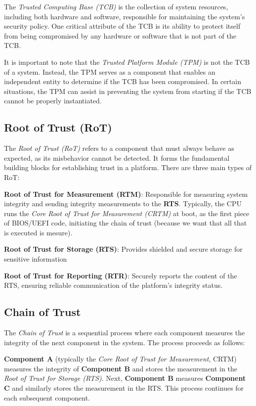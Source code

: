 The \textit{Trusted Computing Base (TCB)} is the collection of system resources, including both hardware and software, responsible for maintaining the system's security policy. One critical attribute of the TCB is its ability to protect itself from being compromised by any hardware or software that is not part of the TCB.

It is important to note that the \textit{Trusted Platform Module (TPM)} is not the TCB of a system. Instead, the TPM serves as a component that enables an independent entity to determine if the TCB has been compromised. In certain situations, the TPM can assist in preventing the system from starting if the TCB cannot be properly instantiated.

\subsection{Root of Trust (RoT)}

The \textit{Root of Trust (RoT)} refers to a component that must always behave as expected, as its misbehavior cannot be detected. It forms the fundamental building blocks for establishing trust in a platform. There are three main types of RoT:

\textbf{Root of Trust for Measurement (RTM)}:  
Responsible for measuring system integrity and sending integrity measurements to the \textbf{RTS}. Typically, the CPU runs the \textit{Core Root of Trust for Measurement (CRTM)} at boot, as the first piece of BIOS/UEFI code, initiating the chain of trust (because we want that all that is executed is mesure).

\textbf{Root of Trust for Storage (RTS)}:  
Provides shielded and secure storage for sensitive information

\textbf{Root of Trust for Reporting (RTR)}:  
Securely reports the content of the RTS, ensuring reliable communication of the platform’s integrity status.


\subsection{Chain of Trust}

The \textit{Chain of Trust} is a sequential process where each component measures the integrity of the next component in the system. The process proceeds as follows:

\textbf{Component A} (typically the \textit{Core Root of Trust for Measurement}, CRTM) measures the integrity of \textbf{Component B} and stores the measurement in the \textit{Root of Trust for Storage (RTS)}. Next, \textbf{Component B} measures \textbf{Component C} and similarly stores the measurement in the RTS. This process continues for each subsequent component.

